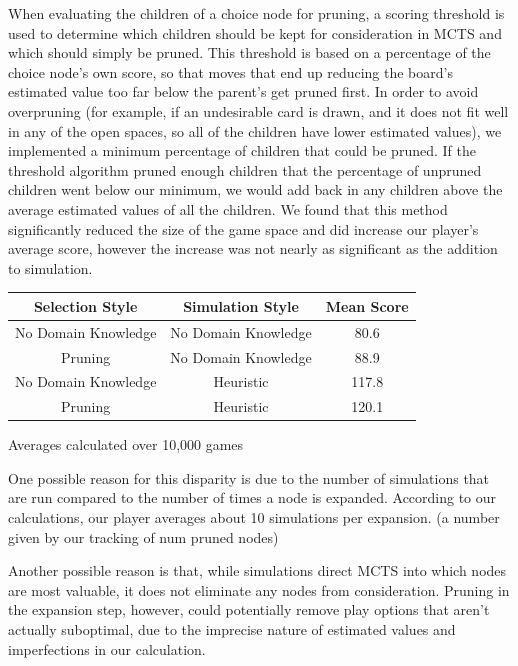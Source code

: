 \documentclass[letterpaper]{article}
\begin{document}
When evaluating the children of a choice node for pruning, a scoring threshold is used to determine which children should be kept for consideration in MCTS and which should simply be pruned. This threshold is based on a percentage of the choice node's own score, so that moves that end up reducing the board's estimated value too far below the parent's get pruned first. In order to avoid overpruning (for example, if an undesirable card is drawn, and it does not fit well in any of the open spaces, so all of the children have lower estimated values), we implemented a minimum percentage of children that could be pruned. If the threshold algorithm pruned enough children that the percentage of unpruned children  went below our minimum, we would add back in any children above the average estimated values of all the children. We found that this method significantly reduced the size of the game space and did increase our player's average score, however the increase was not nearly as significant as the addition to simulation.

\begin{minipage}{\linewidth}
\centering
\label{tbl:SelectionTable}
\begin{tabular}{c c c}
\hline
Selection Style & Simulation Style & Mean Score \\
\hline
No Domain Knowledge & No Domain Knowledge & 80.6 \\
Pruning & No Domain Knowledge & 88.9 \\
No Domain Knowledge & Heuristic & 117.8 \\
Pruning & Heuristic & 120.1 \\
\hline
\end{tabular}\par
\bigskip
Averages calculated over 10,000 games
\end{minipage}

One possible reason for this disparity is due to the number of simulations that are run compared to the number of times a node is expanded. According to our calculations, our player averages about 10 simulations per expansion. (a number given by our tracking of num pruned nodes) 

Another possible reason is that, while simulations direct MCTS into which nodes are most valuable, it does not eliminate any nodes from consideration. Pruning in the expansion step, however, could potentially remove play options that aren’t actually suboptimal, due to the imprecise nature of estimated values and imperfections in our calculation.
\end{document}
